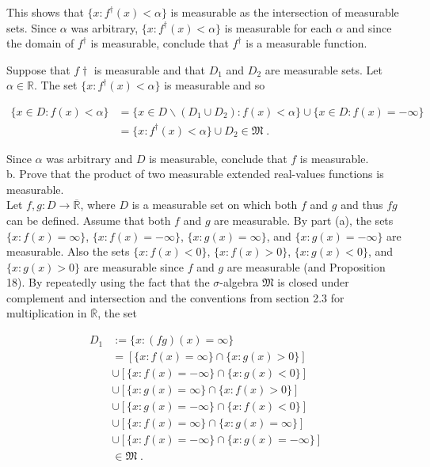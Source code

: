 \documentclass[a4paper]{article}
\begin{document}
This shows that $\{x : f^\dagger(x) < \alpha\}$ is measurable as the intersection of measurable sets. Since $\alpha$ was arbitrary, $\{x : f^\dagger(x) < \alpha\}$ is measurable for each $\alpha$ and since the domain of $f^\dagger$ is measurable, conclude that $f^\dagger$ is a measurable function. 

Suppose that $f\dagger$ is measurable and that $D_1$ and $D_2$ are measurable sets. Let $\alpha \in \mathbb{R}$. The set $\{x : f^\dagger(x) < \alpha\}$ is measurable and so

\begin{align*}
\{x \in D : f(x) < \alpha \} &= \{x \in D\backslash (D_1 \cup D_2) : f(x) < \alpha \} \cup \{x \in D : f(x) = -\infty \}\\
&= \{x : f^\dagger(x) < \alpha\}\cup D_2 \in \mathfrak{M} \;.
\end{align*}

Since $\alpha$ was arbitrary and $D$ is measurable, conclude that $f$ is measurable.\\

b. Prove that the product of two measurable extended real-values functions is measurable. \\

Let $f,g : D \rightarrow \overline{\mathbb{R}}$, where $D$ is a measurable set on which both $f$ and $g$ and thus $fg$ can be defined. Assume that both $f$ and $g$ are measurable. By part (a), the sets $\{x : f(x) = \infty\}$, $\{x : f(x) = -\infty\}$, $\{x : g(x) = \infty\}$, and $\{x : g(x) = -\infty\}$ are measurable. Also the sets $\{x : f(x) < 0\}$, $\{x : f(x) > 0\}$, $\{x : g(x)  < 0\}$, and $\{x : g(x)  > 0\}$ are measurable since $f$ and $g$ are measurable (and Proposition 18). By repeatedly using the fact that the $\sigma$-algebra $\mathfrak{M}$ is closed under complement and intersection and the conventions from section 2.3 for multiplication in $\overline{\mathbb{R}}$, the set


\begin{align*}
D_1 &:= \{x : (fg)(x) = \infty\}\\
&=[\{x : f(x) = \infty\} \cap \{x : g(x) > 0\}]\\
&\cup [\{x : f(x) = -\infty\} \cap \{x : g(x) < 0\}]\\
&\cup [\{x : g(x) = \infty\} \cap \{x : f(x) > 0\}]\\
&\cup [\{x : g(x) = -\infty\} \cap \{x : f(x) < 0\}]\\
&\cup [\{x : f(x) = \infty\} \cap \{x : g(x) = \infty\}]\\
&\cup [\{x : f(x) = -\infty\} \cap \{x : g(x) = -\infty\}]\\
& \in \mathfrak{M} \;.
\end{align*}
\end{document}
